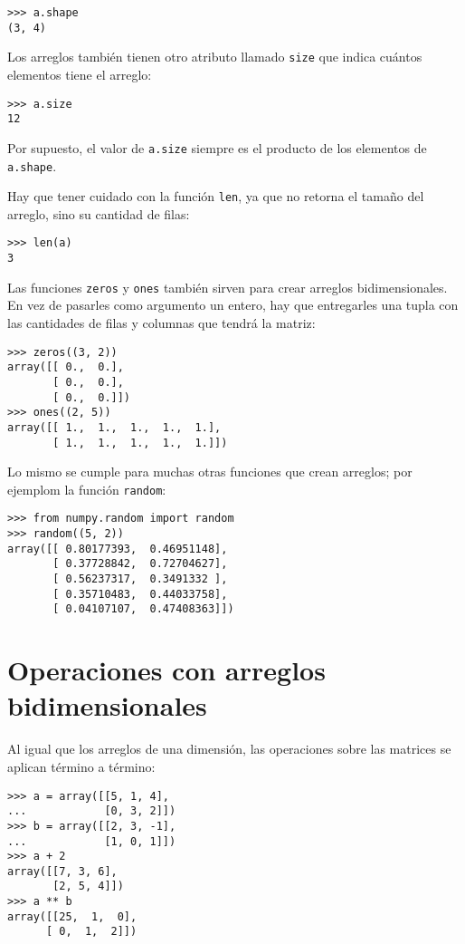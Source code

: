 \begin{lstlisting}
>>> a.shape
(3, 4)
\end{lstlisting}

Los arreglos también tienen otro atributo llamado \lstinline!size! que
indica cuántos elementos tiene el arreglo:

\begin{lstlisting}
>>> a.size
12
\end{lstlisting}

Por supuesto, el valor de \lstinline!a.size! siempre es el producto de
los elementos de \lstinline!a.shape!.

Hay que tener cuidado con la función \lstinline!len!, ya que no retorna
el tamaño del arreglo, sino su cantidad de filas:

\begin{lstlisting}
>>> len(a)
3
\end{lstlisting}

Las funciones \lstinline!zeros! y \lstinline!ones! también sirven para
crear arreglos bidimensionales. En vez de pasarles como argumento un
entero, hay que entregarles una tupla con las cantidades de filas y
columnas que tendrá la matriz:

\begin{lstlisting}
>>> zeros((3, 2))
array([[ 0.,  0.],
       [ 0.,  0.],
       [ 0.,  0.]])
>>> ones((2, 5))
array([[ 1.,  1.,  1.,  1.,  1.],
       [ 1.,  1.,  1.,  1.,  1.]])
\end{lstlisting}

Lo mismo se cumple para muchas otras funciones que crean arreglos; por
ejemplom la función \lstinline!random!:

\begin{lstlisting}
>>> from numpy.random import random
>>> random((5, 2))
array([[ 0.80177393,  0.46951148],
       [ 0.37728842,  0.72704627],
       [ 0.56237317,  0.3491332 ],
       [ 0.35710483,  0.44033758],
       [ 0.04107107,  0.47408363]])
\end{lstlisting}

\section{Operaciones con arreglos bidimensionales}

Al igual que los arreglos de una dimensión, las operaciones sobre las
matrices se aplican término a término:

\begin{lstlisting}
>>> a = array([[5, 1, 4],
...            [0, 3, 2]])
>>> b = array([[2, 3, -1],
...            [1, 0, 1]])
>>> a + 2
array([[7, 3, 6],
       [2, 5, 4]])
>>> a ** b
array([[25,  1,  0],
      [ 0,  1,  2]])
\end{lstlisting}

